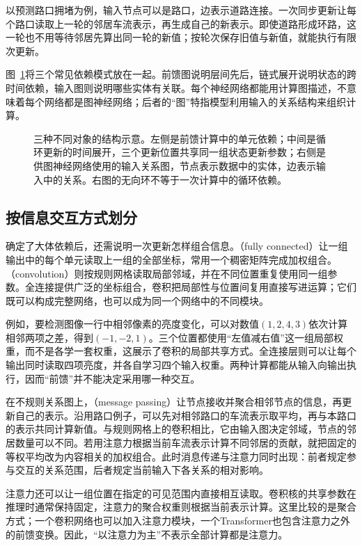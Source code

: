 以预测路口拥堵为例，输入节点可以是路口，边表示道路连接。一次同步更新让每个路口读取上一轮的邻居车流表示，再生成自己的新表示。即使道路形成环路，这一轮也不用等待邻居先算出同一轮的新值；按轮次保存旧值与新值，就能执行有限次更新。

图~\ref{fig:neural-topologies}将三个常见依赖模式放在一起。前馈图说明层间先后，链式展开说明状态的跨时间依赖，输入图则说明哪些实体有关联。每个神经网络都能用计算图描述，不意味着每个网络都是图神经网络；后者的“图”特指模型利用输入的关系结构来组织计算。

\begin{figure}[htbp]
  \centering
  
  \caption{三种不同对象的结构示意。左侧是前馈计算中的单元依赖；中间是循环更新的时间展开，三个更新位置共享同一组状态更新参数；右侧是供图神经网络使用的输入关系图，节点表示数据中的实体，边表示输入中的关系。右图的无向环不等于一次计算中的循环依赖。}
  \label{fig:neural-topologies}
\end{figure}
\FloatBarrier

\subsection{按信息交互方式划分}
\label{sec:neural-types-interaction}

确定了大体依赖后，还需说明一次更新怎样组合信息。（fully connected）让一组输出中的每个单元读取上一组的全部坐标，常用一个稠密矩阵完成加权组合。（convolution）则按规则网格读取局部邻域，并在不同位置重复使用同一组参数。全连接提供广泛的坐标组合，卷积把局部性与位置间复用直接写进运算；它们既可以构成完整网络，也可以成为同一个网络中的不同模块。

例如，要检测图像一行中相邻像素的亮度变化，可以对数值$(1,2,4,3)$依次计算相邻两项之差，得到$(-1,-2,1)$。三个位置都使用“左值减右值”这一组局部权重，而不是各学一套权重，这展示了卷积的局部共享方式。全连接层则可以让每个输出同时读取四项亮度，并各自学习四个输入权重。两种计算都能从输入向输出执行，因而“前馈”并不能决定采用哪一种交互。

在不规则关系图上，（message passing）让节点接收并聚合相邻节点的信息，再更新自己的表示。沿用路口例子，可以先对相邻路口的车流表示取平均，再与本路口的表示共同计算新值。与规则网格上的卷积相比，它由输入图决定邻域，节点的邻居数量可以不同。若用注意力根据当前车流表示计算不同邻居的贡献，就把固定的等权平均改为内容相关的加权组合。此时消息传递与注意力同时出现：前者规定参与交互的关系范围，后者规定当前输入下各关系的相对影响。

注意力还可以让一组位置在指定的可见范围内直接相互读取。卷积核的共享参数在推理时通常保持固定，注意力的聚合权重则根据当前表示计算。这里比较的是聚合方式；一个卷积网络也可以加入注意力模块，一个Transformer也包含注意力之外的前馈变换。因此，“以注意力为主”不表示全部计算都是注意力。

